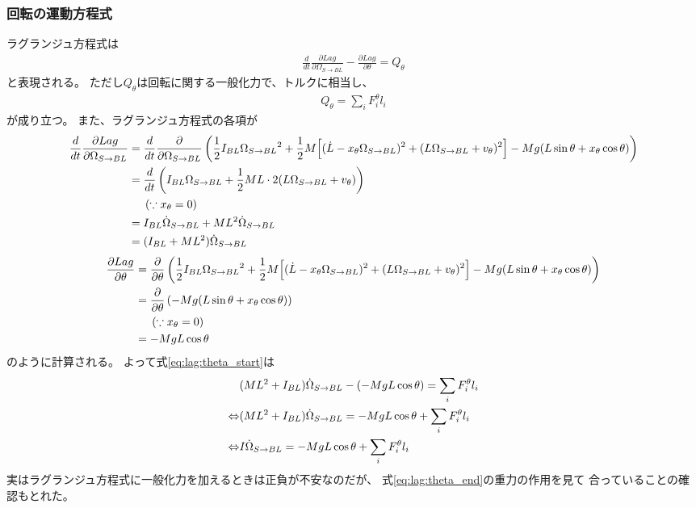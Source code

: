 \documentclass[a4paper,11pt]{jsarticle}
\begin{document}
\subsubsection*{回転の運動方程式}
ラグランジュ方程式は
\begin{align}
  \frac{d}{dt}\frac{\partial Lag}{\partial \Omega_{S\rightarrow BL}{}} - \frac{\partial Lag}{\partial \theta} = Q_\theta
  \label{eq:lag:theta_start}
\end{align}
と表現される。
ただし$Q_\theta$は回転に関する一般化力で、トルクに相当し、
\begin{align*}
  Q_\theta = \sum_i F_i^\theta l_i
\end{align*}
が成り立つ。
また、ラグランジュ方程式の各項が
\begin{align*}
  \frac{d}{dt}\frac{\partial Lag}{\partial \Omega_{S\rightarrow BL}{}}
  &= \frac{d}{dt}\frac{\partial }{\partial \Omega_{S\rightarrow BL}{}}
  \left(
    \frac{1}{2}I_{BL}\Omega_{S\rightarrow BL}{}^2
    + \frac{1}{2}M
    \Bigl[ (\dot{L} - x_\theta \Omega_{S\rightarrow BL}{})^2 + (L\Omega_{S\rightarrow BL}{} + v_\theta)^2 \Bigr]
    - Mg ( L\sin\theta + x_\theta \cos\theta )
  \right)
  \\
  &= \frac{d}{dt} \left( I_{BL}\Omega_{S\rightarrow BL}{} + \frac{1}{2}ML\cdot 2(L\Omega_{S\rightarrow BL}{} + v_\theta) \right)
  \\
  & \ \ \ \ \left( \because x_\theta = 0 \right)
  \\
  &= I_{BL}\dot\Omega_{S\rightarrow BL}{} + ML^2\dot\Omega_{S\rightarrow BL}{}
  \\
  &= (I_{BL} + ML^2)\dot\Omega_{S\rightarrow BL}{}
\end{align*}
\begin{align*}
  \frac{\partial Lag}{\partial \theta}
  &= \frac{\partial }{\partial \theta}
  \left(
    \frac{1}{2}I_{BL}\Omega_{S\rightarrow BL}{}^2
    + \frac{1}{2}M
    \Bigl[ (\dot{L} - x_\theta \Omega_{S\rightarrow BL}{})^2 + (L\Omega_{S\rightarrow BL}{} + v_\theta)^2 \Bigr]
    - Mg ( L\sin\theta + x_\theta \cos\theta )
  \right)
  \\
  &= \frac{\partial }{\partial \theta}\left( - Mg ( L\sin\theta + x_\theta \cos\theta ) \right)
  \\
  & \ \ \ \ \left( \because x_\theta = 0 \right)
  \\
  &= -MgL\cos\theta
\end{align*}
のように計算される。
よって式\ref{eq:lag:theta_start}は
\begin{align}
  & (ML^2 + I_{BL})\dot\Omega_{S\rightarrow BL}{} - ( -MgL\cos\theta ) = \sum_i F_i^\theta l_i
  \notag
  \\
  \Leftrightarrow
  & (ML^2 + I_{BL})\dot\Omega_{S\rightarrow BL}{} = -MgL\cos\theta + \sum_i F_i^\theta l_i
  \notag
  \\
  \Leftrightarrow
  & I\dot\Omega_{S\rightarrow BL}{} = -MgL\cos\theta + \sum_i F_i^\theta l_i
  \label{eq:lag:theta_end}
\end{align}
実はラグランジュ方程式に一般化力を加えるときは正負が不安なのだが、
式\ref{eq:lag:theta_end}の重力の作用を見て
合っていることの確認もとれた。
\end{document}
